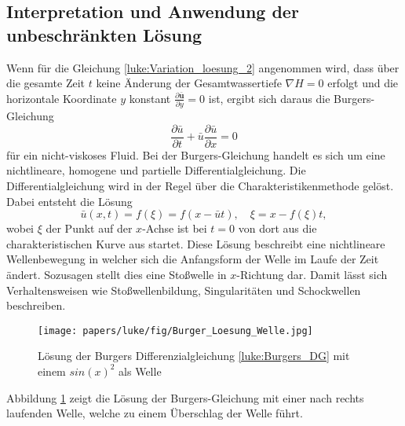 \subsection{Interpretation und Anwendung der unbeschränkten Lösung}
Wenn für die Gleichung \eqref{luke:Variation_loesung_2} angenommen wird, dass über die gesamte Zeit $t$ keine Änderung der Gesamtwassertiefe $ \nabla H = 0 $ erfolgt und die horizontale Koordinate $y$ konstant $\frac{\partial \bar{\bm{u}}}{\partial y} = 0$ ist, ergibt sich daraus die Burgers-Gleichung
\begin{equation}
	\frac{\partial \bar{u}}{\partial t} + \bar{u} \frac{\partial \bar{u}}{\partial x} = 0
	\label{luke:Burgers_DG}
\end{equation}
für ein nicht-viskoses Fluid.
Bei der Burgers-Gleichung handelt es sich um eine nichtlineare, homogene und partielle Differentialgleichung.
Die Differentialgleichung wird in der Regel über die Charakteristikenmethode gelöst. 
%
Dabei entsteht die Lösung
\[
\bar{u}(x,t) = f(\xi) = f(x-\bar{u}t),\quad \xi = x-f(\xi)t,
\]
wobei $\xi$ der Punkt auf der $x$-Achse ist bei $t = 0$ von dort aus die charakteristischen Kurve aus startet.
Diese Lösung beschreibt eine nichtlineare Wellenbewegung in welcher sich die Anfangsform der Welle im Laufe der Zeit ändert.
Sozusagen stellt dies eine Stoßwelle in $x$-Richtung dar.
Damit lässt sich Verhaltensweisen wie Stoßwellenbildung, Singularitäten und Schockwellen beschreiben.
\begin{figure}
	\texttt{[image: papers/luke/fig/Burger\_Loesung\_Welle.jpg]}
	\caption{Lösung der Burgers Differenzialgleichung \eqref{luke:Burgers_DG} mit einem $sin(x)^2$ als Welle
		\label{luke:fig:Loesung_Burgers}}
\end{figure}
Abbildung \ref{luke:fig:Loesung_Burgers} zeigt die Lösung der Burgers-Gleichung mit einer nach rechts laufenden Welle, welche zu einem Überschlag der Welle führt.

